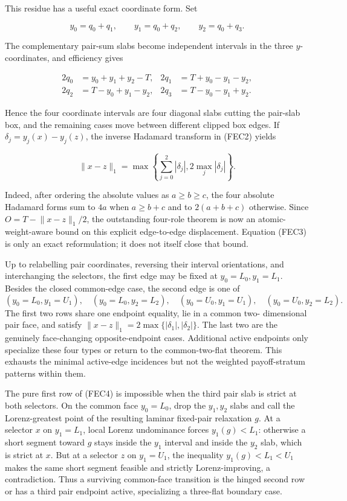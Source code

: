 \documentclass[11pt]{article}
\begin{document}
This residue has a useful exact coordinate form.  Set

\[
 y_0=q_0+q_1,\qquad y_1=q_0+q_2,\qquad y_2=q_0+q_3.             \tag{FEC1}
\]

The complementary pair-sum slabs become independent intervals in the three
$y$-coordinates, and efficiency gives

\[
\begin{aligned}
2q_0&=y_0+y_1+y_2-T, & 2q_1&=T+y_0-y_1-y_2,\\
2q_2&=T-y_0+y_1-y_2, & 2q_3&=T-y_0-y_1+y_2.
\end{aligned}                                           \tag{FEC2}
\]

Hence the four coordinate intervals are four diagonal slabs cutting the
pair-slab box, and the remaining cases move between different clipped box
edges.  If $\delta_j=y_j(x)-y_j(z)$, the inverse Hadamard transform in
(FEC2) yields

\[
 \lVert x-z\rVert_1
 =\max\left\{\sum_{j=0}^2|\delta_j|,
              2\max_j|\delta_j|\right\}.                    \tag{FEC3}
\]

Indeed, after ordering the absolute values as $a\ge b\ge c$, the four
absolute Hadamard forms sum to $4a$ when $a\ge b+c$ and to
$2(a+b+c)$ otherwise.  Since $O=T-\lVert x-z\rVert_1/2$, the outstanding
four-role theorem is now an atomic-weight-aware bound on this explicit
edge-to-edge displacement.  Equation (FEC3) is only an exact reformulation;
it does not itself close that bound.

Up to relabelling pair coordinates, reversing their interval orientations,
and interchanging the selectors, the first edge may be fixed at
$y_0=L_0,y_1=L_1$.  Besides the closed common-edge case, the second edge is
one of
\[
 (y_0=L_0,y_1=U_1),\quad (y_0=L_0,y_2=L_2),\quad
 (y_0=U_0,y_1=U_1),\quad (y_0=U_0,y_2=L_2).          \tag{FEC4}
\]
The first two rows share one endpoint equality, lie in a common two-
dimensional pair face, and satisfy
$\lVert x-z\rVert_1=2\max\{|\delta_1|,|\delta_2|\}$.
The last two are the genuinely face-changing opposite-endpoint cases.
Additional active endpoints only specialize these four types or return to
the common-two-flat theorem.  This exhausts the minimal active-edge
incidences but not the weighted payoff-stratum patterns within them.

The pure first row of (FEC4) is impossible when the third pair slab is
strict at both selectors.  On the common face $y_0=L_0$, drop the
$y_1,y_2$ slabs and call the Lorenz-greatest point of the resulting laminar
fixed-pair relaxation $g$.  At a selector $x$ on $y_1=L_1$, local Lorenz
undominance forces $y_1(g)<L_1$: otherwise a short segment toward $g$ stays
inside the $y_1$ interval and inside the $y_2$ slab, which is strict at
$x$.  But at a selector $z$ on $y_1=U_1$, the inequality
$y_1(g)<L_1<U_1$ makes the same short segment feasible and strictly
Lorenz-improving, a contradiction.  Thus a surviving common-face transition
is the hinged second row or has a third pair endpoint active, specializing a
three-flat boundary case.
\end{document}
